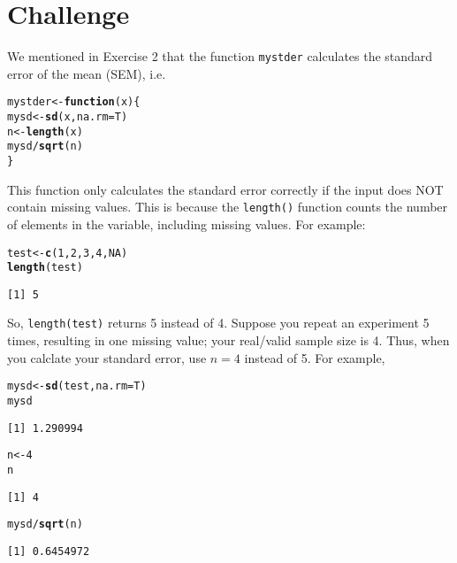 \documentclass[12pt,a4paper]{article}\usepackage[]{graphicx}\usepackage[]{color}
\makeatletter
\newcommand{\hlnum}[1]{\textcolor[rgb]{0.686,0.059,0.569}{#1}}%
\newcommand{\hlopt}[1]{\textcolor[rgb]{0,0,0}{#1}}%
\newcommand{\hlstd}[1]{\textcolor[rgb]{0.345,0.345,0.345}{#1}}%
\newcommand{\hlkwa}[1]{\textcolor[rgb]{0.161,0.373,0.58}{\textbf{#1}}}%
\newcommand{\hlkwb}[1]{\textcolor[rgb]{0.69,0.353,0.396}{#1}}%
\newcommand{\hlkwc}[1]{\textcolor[rgb]{0.333,0.667,0.333}{#1}}%
\newcommand{\hlkwd}[1]{\textcolor[rgb]{0.737,0.353,0.396}{\textbf{#1}}}%
\newenvironment{kframe}{%
 \def\at@end@of@kframe{}%
 \ifinner\ifhmode%
  \def\at@end@of@kframe{\end{minipage}}%
  \begin{minipage}{\columnwidth}%
 \fi\fi%
 \def\FrameCommand##1{\hskip\@totalleftmargin \hskip-\fboxsep
 \colorbox{shadecolor}{##1}\hskip-\fboxsep
     \hskip-\linewidth \hskip-\@totalleftmargin \hskip\columnwidth}%
 \MakeFramed {\advance\hsize-\width
   \@totalleftmargin\z@ \linewidth\hsize
   \@setminipage}}%
 {\par\unskip\endMakeFramed%
 \at@end@of@kframe}
\newenvironment{knitrout}{}{} %
\makeatother
\begin{document}
\section{Challenge}
\label{sec:cha}
We mentioned in Exercise 2 that the function \texttt{mystder} calculates
the standard error of the mean (SEM), i.e. 
\begin{knitrout}
\color{fgcolor}\begin{kframe}
\begin{alltt}
\hlstd{mystder} \hlkwb{<-} \hlkwa{function}\hlstd{(}\hlkwc{x}\hlstd{)\{}
       \hlstd{mysd} \hlkwb{<-} \hlkwd{sd}\hlstd{(x,} \hlkwc{na.rm} \hlstd{= T)}
       \hlstd{n} \hlkwb{<-} \hlkwd{length}\hlstd{(x)}
       \hlstd{mysd}\hlopt{/}\hlkwd{sqrt}\hlstd{(n)}
\hlstd{\}}
\end{alltt}
\end{kframe}
\end{knitrout}
This function only calculates the standard error correctly if the input does NOT contain missing values. This is because the \texttt{length()} function counts the number of elements in the variable, including missing values. For example:
\begin{knitrout}
\color{fgcolor}\begin{kframe}
\begin{alltt}
\hlstd{test} \hlkwb{<-} \hlkwd{c}\hlstd{(}\hlnum{1}\hlstd{,} \hlnum{2}\hlstd{,} \hlnum{3}\hlstd{,} \hlnum{4}\hlstd{,} \hlnum{NA}\hlstd{)}
\hlkwd{length}\hlstd{(test)}
\end{alltt}
\begin{verbatim}
[1] 5
\end{verbatim}
\end{kframe}
\end{knitrout}
So, \texttt{length(test)} returns 5 instead of 4. Suppose you repeat an experiment 5 times, resulting in one missing value; your real/valid sample size is 4. Thus, when you calclate your standard error, use $n = 4$ instead of 5. For example,
\begin{knitrout}
\color{fgcolor}\begin{kframe}
\begin{alltt}
\hlstd{mysd} \hlkwb{<-} \hlkwd{sd}\hlstd{(test,} \hlkwc{na.rm} \hlstd{= T)}
\hlstd{mysd}
\end{alltt}
\begin{verbatim}
[1] 1.290994
\end{verbatim}
\begin{alltt}
\hlstd{n} \hlkwb{<-} \hlnum{4}
\hlstd{n}
\end{alltt}
\begin{verbatim}
[1] 4
\end{verbatim}
\begin{alltt}
\hlstd{mysd}\hlopt{/}\hlkwd{sqrt}\hlstd{(n)}
\end{alltt}
\begin{verbatim}
[1] 0.6454972
\end{verbatim}
\end{kframe}
\end{knitrout}
\end{document}
